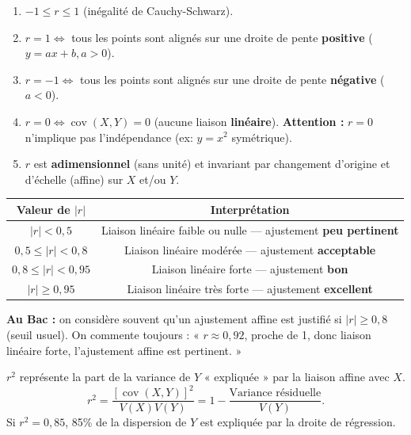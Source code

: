 \documentclass[11pt]{article}
\begin{document}
\begin{propriete}
\begin{enumerate}
\item $-1 \le r \le 1$ (inégalité de Cauchy-Schwarz).
\item $r = 1 \Leftrightarrow$ tous les points sont alignés sur une droite de pente \textbf{positive} ($y=ax+b, a>0$).
\item $r = -1 \Leftrightarrow$ tous les points sont alignés sur une droite de pente \textbf{négative} ($a<0$).
\item $r = 0 \Leftrightarrow \operatorname{cov}(X,Y)=0$ (aucune liaison \textbf{linéaire}). \textbf{Attention :} $r=0$ n'implique pas l'indépendance (ex: $y=x^2$ symétrique).
\item $r$ est \textbf{adimensionnel} (sans unité) et invariant par changement d'origine et d'échelle (affine) sur $X$ et/ou $Y$.
\end{enumerate}
\end{propriete}

\begin{aretenir}
\begin{center}
\begin{tabular}{|c|c|}
\hline
\rowcolor{popblueL} Valeur de $|r|$ & Interprétation \\ \hline
$|r| < 0{,}5$ & Liaison linéaire faible ou nulle — ajustement \textbf{peu pertinent} \\ \hline
$0{,}5 \le |r| < 0{,}8$ & Liaison linéaire modérée — ajustement \textbf{acceptable} \\ \hline
$0{,}8 \le |r| < 0{,}95$ & Liaison linéaire forte — ajustement \textbf{bon} \\ \hline
$|r| \ge 0{,}95$ & Liaison linéaire très forte — ajustement \textbf{excellent} \\ \hline
\end{tabular}
\end{center}
\textbf{Au Bac :} on considère souvent qu'un ajustement affine est justifié si $|r| \ge 0{,}8$ (seuil usuel). On commente toujours : « $r \approx 0,92$, proche de 1, donc liaison linéaire forte, l'ajustement affine est pertinent. »
\end{aretenir}

\begin{propriete}
$r^2$ représente la part de la variance de $Y$ « expliquée » par la liaison affine avec $X$.
\[
r^2 = \frac{[\operatorname{cov}(X,Y)]^2}{V(X)V(Y)} = 1 - \frac{\text{Variance résiduelle}}{V(Y)}.
\]
Si $r^2 = 0,85$, 85\% de la dispersion de $Y$ est expliquée par la droite de régression.
\end{propriete}
\end{document}
